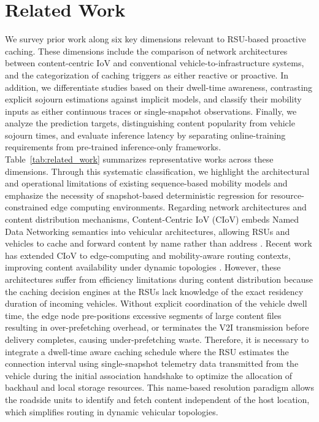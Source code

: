 \documentclass[journal]{IEEEtran}
\begin{document}
\section{Related Work} \label{sec:related}
We survey prior work along six key dimensions relevant to RSU-based proactive caching. These dimensions include the comparison of network architectures between content-centric IoV and conventional vehicle-to-infrastructure systems, and the categorization of caching triggers as either reactive or proactive. In addition, we differentiate studies based on their dwell-time awareness, contrasting explicit sojourn estimations against implicit models, and classify their mobility inputs as either continuous traces or single-snapshot observations. Finally, we analyze the prediction targets, distinguishing content popularity from vehicle sojourn times, and evaluate inference latency by separating online-training requirements from pre-trained inference-only frameworks. Table~\ref{tab:related_work} summarizes representative works across these dimensions. Through this systematic classification, we highlight the architectural and operational limitations of existing sequence-based mobility models and emphasize the necessity of snapshot-based deterministic regression for resource-constrained edge computing environments.
Regarding network architectures and content distribution mechanisms, Content-Centric IoV (CIoV) embeds Named Data Networking semantics into vehicular architectures, allowing RSUs and vehicles to cache and forward content by name rather than address \cite{su2017, wang2017, li2017}. Recent work has extended CIoV to edge-computing and mobility-aware routing contexts, improving content availability under dynamic topologies \cite{khan2018, khan2025, lim2025}. However, these architectures suffer from efficiency limitations during content distribution because the caching decision engines at the RSUs lack knowledge of the exact residency duration of incoming vehicles. Without explicit coordination of the vehicle dwell time, the edge node pre-positions excessive segments of large content files resulting in over-prefetching overhead, or terminates the V2I transmission before delivery completes, causing under-prefetching waste. Therefore, it is necessary to integrate a dwell-time aware caching schedule where the RSU estimates the connection interval using single-snapshot telemetry data transmitted from the vehicle during the initial association handshake to optimize the allocation of backhaul and local storage resources. This name-based resolution paradigm allows the roadside units to identify and fetch content independent of the host location, which simplifies routing in dynamic vehicular topologies.
\end{document}
